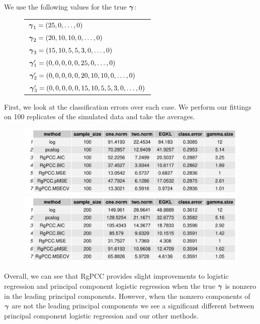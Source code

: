 \documentclass[main.tex]{subfiles}
\begin{document}
We use the following values for the true $\boldsymbol \gamma$:
\begin{figure}[H]
	\begin{tabular}{l}
		$\boldsymbol \gamma_1 = (25, 0, \ldots , 0)$ \\
		$\boldsymbol \gamma_2 = (20, 10, 10, 0, \ldots , 0)$ \\
		$\boldsymbol \gamma_3 = (15, 10, 5, 5, 3, 0, \ldots , 0)$\\
		$\boldsymbol \gamma_1' = (0, 0, 0, 0, 0, 25, 0, \ldots , 0)$ \\
		$\boldsymbol \gamma_2' = (0, 0, 0, 0, 0,  20, 10, 10, 0, \ldots , 0)$ \\
		$\boldsymbol \gamma_3' = (0, 0, 0, 0, 0,  15, 10, 5, 5, 3, 0, \ldots , 0)$
	\end{tabular}
\end{figure}

First, we look at the classification errors over each case. We perform our fittings on 100 replicates of the simulated data and take the averages.

\begin{figure}[H]
    \centering
    \includegraphics[width =  \textwidth]{new-tables/(sparsity1-100,12)_metrics.pdf}
    \includegraphics[width =  \textwidth]{new-tables/(sparsity1-200,12)_metrics.pdf}
    \label{fig:my_label}
\end{figure}

Overall, we can see that RgPCC provides slight improvements to logistic regression and principal component logistic regression when the true $\boldsymbol \gamma$ is nonzero in the leading principal components. However, when the nonzero components of $\boldsymbol \gamma$ are not the leading principal components we see a significant different between principal component logistic regression and our other methods.
\end{document}
